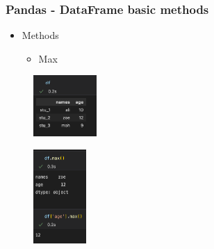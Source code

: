 \begin{frame}\frametitle{Pandas - DataFrame basic methods}
   \begin{minipage}{0.58\linewidth}
      \begin{itemize}
         \item Methods
         \begin{itemize}
            \item Max
         \end{itemize}
      \end{itemize}
      \vspace{.5cm}
      \begin{figure}[H]
         \includegraphics[width=2.4cm]{../images/illustrations/pandas_df_ex.png}
      \end{figure}
   \end{minipage}
   \begin{minipage}{0.38\linewidth}
      \begin{figure}[H]
         \includegraphics[width=2cm]{../images/illustrations/pandas_max.png}
      \end{figure}
   \end{minipage}
\end{frame}

